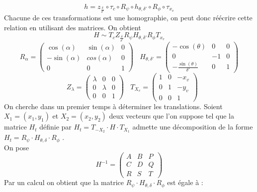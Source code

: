 \begin{prop}
\begin{equation*}
h=z_{\frac{\delta}{\delta'}} \circ \tau_{c}\circ R_{\psi} \circ h_{\theta,\delta'} \circ R_{\phi} \circ \tau_{x_{v}}
\end{equation*}
Chacune de ces transformations est une homographie, on peut donc réécrire cette relation en utilisant des matrices. On obtient 
 \begin{equation*}
H\sim T_{c} Z_{\frac{\delta}{\delta'}}  R_{\psi}  H_{\theta,\delta'} R_{\phi}  T_{x_{v}}
\end{equation*}
\begin{equation*}
R_{\alpha}=\begin{pmatrix}
\cos(\alpha)&\sin(\alpha)&0\\-\sin(\alpha)&cos(\alpha)&0\\0&0&1
\end{pmatrix}
~~~~H_{\theta,\delta'}=\begin{pmatrix}
-\cos(\theta)&0&0\\0&-1&0\\-\frac{\sin(\theta)}{\delta'}&0&1
\end{pmatrix}
\end{equation*}
\begin{equation*}
~~~~Z_{\lambda}=\begin{pmatrix}
\lambda&0&0\\0&\lambda&0\\0&0&1
\end{pmatrix}
~~~~T_{X_{v}}=\begin{pmatrix}
1&0&-x_{v}\\0&1&-y_{v}\\0&0&1
\end{pmatrix}
\end{equation*}
 On cherche dans un premier temps à déterminer les translations. Soient $X_1 = (x_1 , y_1 )$ et $X_2 = (x_2 , y_2 )$ deux vecteurs que l'on suppose tel que la matrice $H_t$ définie par $H_t = T_{-X_2}  \cdot H \cdot T_{X_1}$ admette une décomposition de la forme  $H_t=R_{\psi} \cdot H_{\theta,\delta} \cdot R_{\phi}$ .\\
 On pose 
 \begin{equation*}
 H^{-1}=\begin{pmatrix} A&B&P\\C&D&Q\\R&S&T \end{pmatrix}
 \end{equation*}
 Par un calcul on obtient que la matrice $R_{\psi} \cdot H_{\theta,\delta} \cdot R_{\phi}$ est égale à : 

\end{prop}
